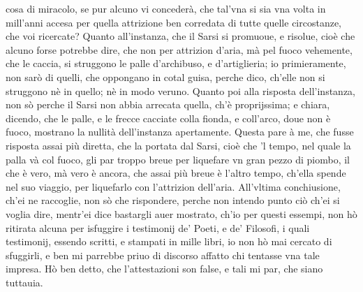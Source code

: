 \documentclass[11pt,twoside,openany]{book}
\begin{document}
cosa di miracolo, se pur alcuno vi concederà, che tal'vna si sia vna volta in mill'anni accesa per quella attrizione ben corredata di tutte quelle circostanze, che voi ricercate? Quanto all'instanza, che il Sarsi si promuoue, e risolue, cioè che alcuno forse potrebbe dire, che non per attrizion d'aria, mà pel fuoco vehemente, che le caccia, si struggono le palle d'archibuso, e d'artiglieria; io primieramente, non sarò di quelli, che oppongano in cotal guisa, perche dico, ch'elle non si struggono nè in quello; nè in modo veruno. Quanto poi alla risposta dell'instanza, non sò perche il Sarsi non abbia arrecata quella, ch'è proprijssima; e chiara, dicendo, che le palle, e le frecce cacciate colla fionda, e coll'arco, doue non è fuoco, mostrano la nullità dell'instanza apertamente. Questa pare à me, che fusse risposta assai più diretta, che la portata dal Sarsi, cioè che 'l tempo, nel quale la palla và col fuoco, gli par troppo breue per liquefare vn gran pezzo di piombo, il che è vero, mà vero è ancora, che assai più breue è l'altro tempo, ch'ella spende nel suo viaggio, per liquefarlo con l'attrizion dell'aria. All'vltima conchiusione, ch'ei ne raccoglie, non sò che rispondere, perche non intendo punto ciò ch'ei si voglia dire, mentr'ei dice bastargli auer mostrato, ch'io per questi essempi, non hò ritirata alcuna per isfuggire i testimonij de' Poeti, e de' Filosofi, i quali testimonij, essendo scritti, e stampati in mille libri, io non hò mai cercato di sfuggirli, e ben mi parrebbe priuo di discorso affatto chi tentasse vna tale impresa. Hò ben detto, che l'attestazioni son false, e tali mi par, che siano tuttauia.
\end{document}
